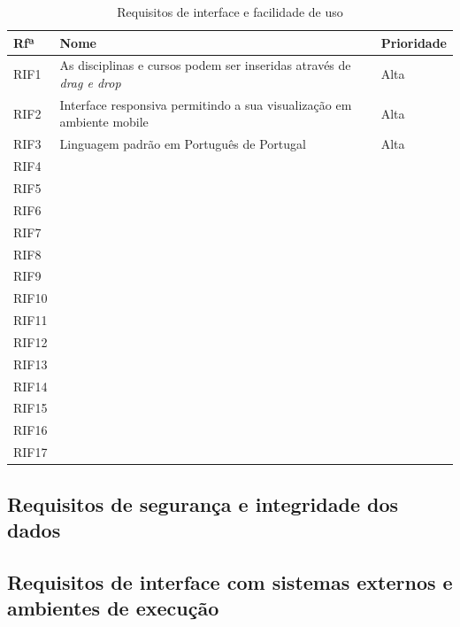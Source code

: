 \documentclass[11pt, twoside]{report}
\begin{document}
		\begin{table}[H]
		\centering
		\caption{Requisitos de interface e facilidade de uso}	
		\vspace{0.5cm}
		\begin{tabular}{|l|l|l|}
			\hline
			Rfª & Nome & Prioridade\\
			\hline
			RIF1 & As disciplinas e cursos podem ser inseridas através de \textit{drag e drop} &Alta\\
			\hline
			RIF2 & Interface responsiva permitindo a sua visualização em ambiente mobile &Alta\\
			\hline
			RIF3 & Linguagem padrão em Português de Portugal &Alta\\
			\hline
			RIF4 &&\\
			\hline
			RIF5 &&\\
			\hline
			RIF6&&\\
			\hline
			RIF7& & \\
			\hline
			RIF8& & \\
			\hline
			RIF9& &\\
			\hline
			RIF10&&\\
			\hline
			RIF11&&\\
			\hline
			RIF12& &\\
			\hline
			RIF13&&\\
			\hline
			RIF14&&\\
			\hline
			RIF15&&\\
			\hline
			RIF16&&\\
			\hline
			RIF17&&\\
			\hline
		\end{tabular}
		\label{requisitosdeinterface}
	\end{table}
	\subsection{Requisitos de segurança e integridade dos dados}
	
	
	
	
	
	\subsection{Requisitos de interface com sistemas externos e ambientes de execução}
	
\end{document}
